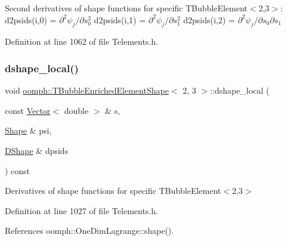 Second derivatives of shape functions for specific T\+Bubble\+Element$<$2,3$>$\+: d2psids(i,0) = $ \partial^2 \psi_j / \partial s_0^2 $ d2psids(i,1) = $ \partial^2 \psi_j / \partial s_1^2 $ d2psids(i,2) = $ \partial^2 \psi_j / \partial s_0 \partial s_1 $ 

Definition at line 1062 of file Telements.\+h.

\mbox{\label{classoomph_1_1TBubbleEnrichedElementShape_3_012_00_013_01_4_a387669740bbba3fb6c8931c82290581f}} 
\subsubsection{\texorpdfstring{dshape\+\_\+local()}{dshape\_local()}}
{\footnotesize\ttfamily void \hyperlink{classoomph_1_1TBubbleEnrichedElementShape}{oomph\+::\+T\+Bubble\+Enriched\+Element\+Shape}$<$ 2, 3 $>$\+::dshape\+\_\+local (\begin{DoxyParamCaption}\item[{const \hyperlink{classoomph_1_1Vector}{Vector}$<$ double $>$ \&}]{s,  }\item[{\hyperlink{classoomph_1_1Shape}{Shape} \&}]{psi,  }\item[{\hyperlink{classoomph_1_1DShape}{D\+Shape} \&}]{dpsids }\end{DoxyParamCaption}) const\hspace{0.3cm}{\ttfamily [inline]}}



Derivatives of shape functions for specific T\+Bubble\+Element$<$2,3$>$ 



Definition at line 1027 of file Telements.\+h.



References oomph\+::\+One\+Dim\+Lagrange\+::shape().

\mbox{\label{classoomph_1_1TBubbleEnrichedElementShape_3_012_00_013_01_4_a9dc70ccca180e2e00755ca906b774694}} 

